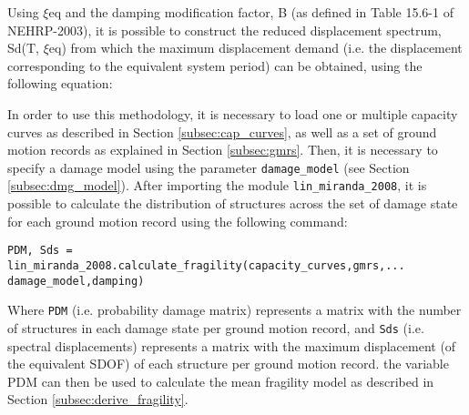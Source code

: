 Using $\xi$eq and the damping modification factor, B (as defined in Table 15.6-1 of NEHRP-2003), it is possible to construct the reduced displacement spectrum, Sd(T, $\xi$eq) from which the maximum displacement demand (i.e. the displacement corresponding to the equivalent system period) can be obtained, using the following equation:
	  
In order to use this methodology, it is necessary to load one or multiple capacity curves as described in Section \ref{subsec:cap_curves}, as well as a set of ground motion records as explained in Section \ref{subsec:gmrs}. Then, it is necessary to specify a damage model using the parameter \verb=damage_model= (see Section \ref{subsec:dmg_model}). After importing the module \verb=lin_miranda_2008=, it is possible to calculate the distribution of structures across the set of damage state for each ground motion record using the following command:

\begin{Verbatim}[frame=single, commandchars=\\\{\}, samepage=true]
PDM, Sds = lin_miranda_2008.calculate_fragility(capacity_curves,gmrs,...
damage_model,damping)
\end{Verbatim}

Where \verb=PDM= (i.e. probability damage matrix) represents a matrix with the number of structures in each damage state per ground motion record, and \verb=Sds= (i.e. spectral displacements) represents a matrix with the maximum displacement (of the equivalent SDOF) of each structure per ground motion record. the variable PDM can then be used to calculate the mean fragility model as described in Section \ref{subsec:derive_fragility}.




